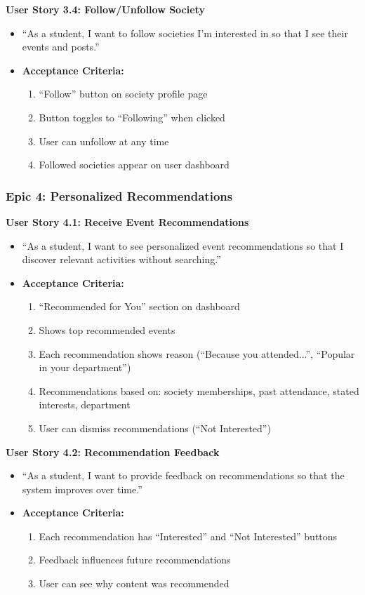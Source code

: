 \documentclass[12pt,a4paper]{article}
\begin{document}
\textbf{User Story 3.4: Follow/Unfollow Society}
\begin{itemize}
    \item ``As a student, I want to follow societies I'm interested in so that I see their events and posts.''
    \item \textbf{Acceptance Criteria:}
    \begin{enumerate}
        \item ``Follow'' button on society profile page
        \item Button toggles to ``Following'' when clicked
        \item User can unfollow at any time
        \item Followed societies appear on user dashboard
    \end{enumerate}
\end{itemize}

\subsubsection{Epic 4: Personalized Recommendations}

\textbf{User Story 4.1: Receive Event Recommendations}
\begin{itemize}
    \item ``As a student, I want to see personalized event recommendations so that I discover relevant activities without searching.''
    \item \textbf{Acceptance Criteria:}
    \begin{enumerate}
        \item ``Recommended for You'' section on dashboard
        \item Shows top recommended events
        \item Each recommendation shows reason (``Because you attended...'', ``Popular in your department'')
        \item Recommendations based on: society memberships, past attendance, stated interests, department
        \item User can dismiss recommendations (``Not Interested'')
    \end{enumerate}
\end{itemize}

\textbf{User Story 4.2: Recommendation Feedback}
\begin{itemize}
    \item ``As a student, I want to provide feedback on recommendations so that the system improves over time.''
    \item \textbf{Acceptance Criteria:}
    \begin{enumerate}
        \item Each recommendation has ``Interested'' and ``Not Interested'' buttons
        \item Feedback influences future recommendations
        \item User can see why content was recommended
    \end{enumerate}
\end{itemize}
\end{document}
